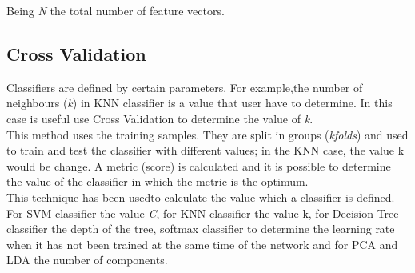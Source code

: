 Being \textit{N} the total number of feature vectors.\\

\subsection{Cross Validation}
Classifiers are defined by certain parameters. For example,the number of neighbours (\textit{k}) in KNN classifier is a value that user have to determine. In this case is useful use Cross Validation to determine the value of \textit{k}.\\

This method uses the training samples. They are split in groups (\textit{kfolds}) and used to train and test the classifier with different values; in the KNN case, the value k would be change. A metric (score) is calculated and it is possible to determine the value of the classifier in which the metric is the optimum.\\

This technique has been usedto calculate the value which a classifier is defined. For SVM classifier the value \textit{C}, for KNN classifier the value {k}, for Decision Tree classifier the depth of the tree, softmax classifier to determine the learning rate when it has not been trained at the same time of the network and for PCA and LDA the number of components. \\
